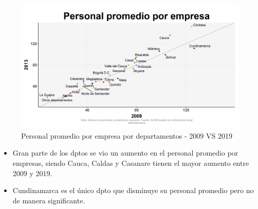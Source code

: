     \begin{figure}[H]
        \caption{Personal promedio por empresa por departamentos - 2009 VS 2019 \label{map_result_2} }
        \begin{center}
        \includegraphics[width=\textwidth,keepaspectratio]{img/var_220_scatter_time.png}
        \end{center}
    \end{figure}
            \begin{itemize}
                    \item Gran parte de los dptos se vio un aumento en el personal promedio por empresas, siendo Cauca, Caldas y Casanare tienen el mayor aumento entre 2009 y 2019.
                    \item Cundinamarca es el único dpto que disminuye su personal promedio pero no de manera significante.
                    \end{itemize}

